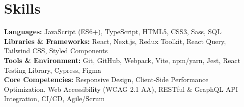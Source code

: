 \section{Skills}
\textbf{Languages:} JavaScript (ES6+), TypeScript, HTML5, CSS3, Sass, SQL \\
\textbf{Libraries \& Frameworks:} React, Next.js, Redux Toolkit, React Query, Tailwind CSS, Styled Components \\
\textbf{Tools \& Environment:} Git, GitHub, Webpack, Vite, npm/yarn, Jest, React Testing Library, Cypress, Figma \\
\textbf{Core Competencies:} Responsive Design, Client-Side Performance Optimization, Web Accessibility (WCAG 2.1 AA), RESTful \& GraphQL API Integration, CI/CD, Agile/Scrum
